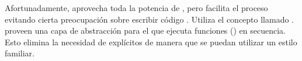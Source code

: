Afortunadamente, \meteor aprovecha toda la potencia de \eventloopCPT, pero facilita el proceso evitando cierta preocupación sobre escribir código \asynchronous. Utiliza el concepto llamado \fibers \behindthescenes. \fibers proveen una capa de abstracción para el \eventloopCPT que ejecuta funciones \asynchronous(\tasks) en secuencia. Esto elimina la necesidad de \callbacksPL explícitos de manera que se puedan utilizar un estilo \synchronous familiar.

